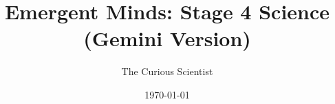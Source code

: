 \documentclass[justified,notoc]{tufte-book}
\title{Emergent Minds: Stage 4 Science (Gemini Version)}
\author{The Curious Scientist}
\date{\today}
\begin{document}
\maketitle

\tableofcontents


\FloatBarrier


\FloatBarrier


\FloatBarrier

% 
% 
% 
% 
% 
% 
% 
% 
% 
% 
% 
% 
% 
% 
% 
\end{document}
